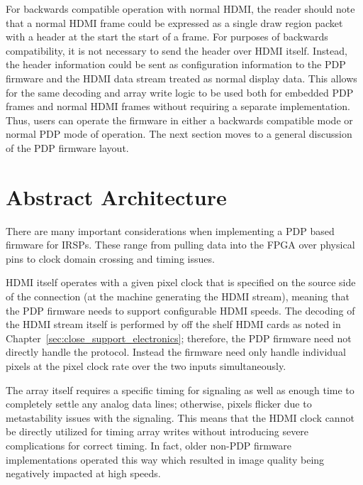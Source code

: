     For backwards compatible operation with normal HDMI, the reader should note that a normal HDMI frame could be expressed as a single draw region packet with a header at the start the start of a frame. For purposes of backwards compatibility, it is not necessary to send the header over HDMI itself. Instead, the header information could be sent as configuration information to the PDP firmware and the HDMI data stream treated as normal display data. This allows for the same decoding and array write logic to be used both for embedded PDP frames and normal HDMI frames without requiring a separate implementation. Thus, users can operate the firmware in either a backwards compatible mode or normal PDP mode of operation. The next section moves to a general discussion of the PDP firmware layout.

\section{Abstract Architecture}
    There are many important considerations when implementing a PDP based firmware for IRSPs. These range from pulling data into the FPGA over physical pins to clock domain crossing and timing issues.

    HDMI itself operates with a given pixel clock that is specified on the source side of the connection (at the machine generating the HDMI stream), meaning that the PDP firmware needs to support configurable HDMI speeds. The decoding of the HDMI stream itself is performed by off the shelf HDMI cards as noted in Chapter~\ref{sec:close_support_electronics}; therefore, the PDP firmware need not directly handle the protocol. Instead the firmware need only handle individual pixels at the pixel clock rate over the two inputs simultaneously.

    The array itself requires a specific timing for signaling as well as enough time to completely settle any analog data lines; otherwise, pixels flicker due to metastability issues with the signaling. This means that the HDMI clock cannot be directly utilized for timing array writes without introducing severe complications for correct timing. In fact, older non-PDP firmware implementations operated this way which resulted in image quality being negatively impacted at high speeds.

